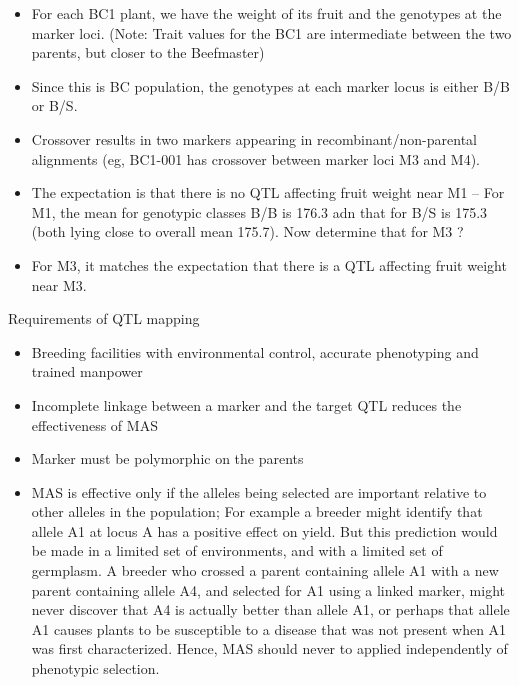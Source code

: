 \documentclass[
  ignorenonframetext,
  aspectratio=169]{beamer}
\providecommand{\tightlist}{%
  \setlength{\itemsep}{0pt}\setlength{\parskip}{0pt}}
\begin{document}
\begin{frame}{}
\protect\hypertarget{section-6}{}
\begin{itemize}
\tightlist
\item
  For each BC1 plant, we have the weight of its fruit and the genotypes
  at the marker loci. (Note: Trait values for the BC1 are intermediate
  between the two parents, but closer to the Beefmaster)
\item
  Since this is BC population, the genotypes at each marker locus is
  either B/B or B/S.
\item
  Crossover results in two markers appearing in recombinant/non-parental
  alignments (eg, BC1-001 has crossover between marker loci M3 and M4).
\item
  The expectation is that there is no QTL affecting fruit weight near M1
  -- For M1, the mean for genotypic classes B/B is 176.3 adn that for
  B/S is 175.3 (both lying close to overall mean 175.7). Now determine
  that for M3 ?
\item
  For M3, it matches the expectation that there is a QTL affecting fruit
  weight near M3.
\end{itemize}
\end{frame}

\begin{frame}{Requirements of QTL mapping}
\protect\hypertarget{requirements-of-qtl-mapping}{}
\begin{itemize}
\tightlist
\item
  Breeding facilities with environmental control, accurate phenotyping
  and trained manpower
\item
  Incomplete linkage between a marker and the target QTL reduces the
  effectiveness of MAS
\item
  Marker must be polymorphic on the parents
\item
  MAS is effective only if the alleles being selected are important
  relative to other alleles in the population; For example a breeder
  might identify that allele A1 at locus A has a positive effect on
  yield. But this prediction would be made in a limited set of
  environments, and with a limited set of germplasm. A breeder who
  crossed a parent containing allele A1 with a new parent containing
  allele A4, and selected for A1 using a linked marker, might never
  discover that A4 is actually better than allele A1, or perhaps that
  allele A1 causes plants to be susceptible to a disease that was not
  present when A1 was first characterized. Hence, MAS should never to
  applied independently of phenotypic selection.
\end{itemize}
\end{frame}
\end{document}
